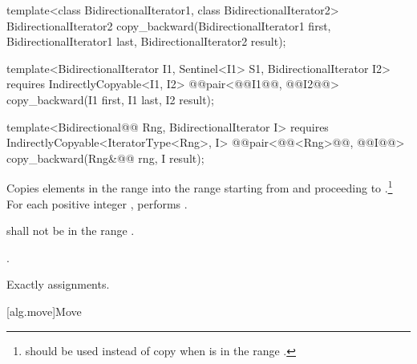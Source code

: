 %
\begin{removedblock}
\begin{itemdecl}
template<class BidirectionalIterator1, class BidirectionalIterator2>
  BidirectionalIterator2
    copy_backward(BidirectionalIterator1 first,
                  BidirectionalIterator1 last,
                  BidirectionalIterator2 result);
\end{itemdecl}
\end{removedblock}
\begin{addedblock}
\begin{itemdecl}
template<BidirectionalIterator I1, Sentinel<I1> S1, BidirectionalIterator I2>
  requires IndirectlyCopyable<I1, I2>
  @@pair<@@I1@\newtxt{)}@, @@I2@\newtxt{)}@>
    copy_backward(I1 first, I1 last, I2 result);

template<Bidirectional@@ Rng, BidirectionalIterator I>
  requires IndirectlyCopyable<IteratorType<Rng>, I>
  @@pair<@@<Rng>@\newtxt{)}@, @@I@\newtxt{)}@>
    copy_backward(Rng&@\newtxt{\&}@ rng, I result);
\end{itemdecl}
\end{addedblock}

\begin{itemdescr}
\pnum
\effects
Copies elements in the range 
into the
range 
starting from
and proceeding to .\footnote{
should be used instead of copy when 
is in
the range
.}
For each positive integer
,
performs
.

\pnum
\requires
{}
shall not be in the range
.

\pnum
\returns
{}.

\pnum
\complexity
Exactly
assignments.
\end{itemdescr}

[alg.move]{Move}


